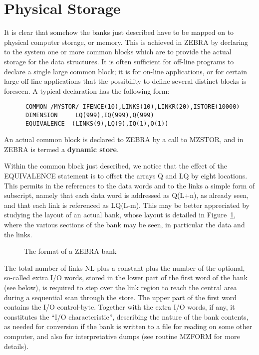 \section{Physical Storage}
\par It is clear that somehow the banks just described have to be mapped on
to physical computer storage, or memory.
This is achieved in ZEBRA by declaring to the system one or more common
blocks which are to provide the actual storage for the data structures.
It is often sufficient for off-line programs to declare a single large
common block; it is for on-line applications, or for certain large
off-line applications that the possibility to define several distinct
blocks is foreseen. A typical declaration has the following form:
\begin{verbatim}
      COMMON /MYSTOR/ IFENCE(10),LINKS(10),LINKR(20),ISTORE(10000)
      DIMENSION     LQ(999),IQ(999),Q(999)
      EQUIVALENCE  (LINKS(9),LQ(9),IQ(1),Q(1))
\end{verbatim}
An actual common block is declared to ZEBRA by a call to MZSTOR,
and in ZEBRA is termed a {\bf dynamic store}.
\par
Within the common block just described, we notice that the effect of the
EQUIVALENCE statement is to offset the arrays Q and LQ by eight
locations. This permits in the references to the data words and to the
links a simple form of subscript, namely that each data word is
addressed as Q(L+n), as already seen, and that each link is referenced
as LQ(L-m). This may be better appreciated by studying the layout of an
actual bank, whose layout is detailed in Figure~\ref{BNKFORM},
where the various sections of the bank may be seen, in particular the
data and the links.
\begin{figure}
\caption{The format of a ZEBRA bank}
\label{BNKFORM}
\end{figure}
\par
The total number of links NL plus a constant plus the number of the
optional, so-called extra I/O words, stored
in the lower part of the first word of the bank (see below),
is required to step over the link
region to reach the central area during a sequential scan
through the store.
The upper part of the first word contains the I/O control-byte.
Together with the extra I/O words, if any, it constitutes the
``I/O characteristic'', describing the nature of the bank contents,
as needed for conversion if the bank is written to a file for reading
on some other computer, and also for interpretative dumps
(see routine MZFORM for more details).
